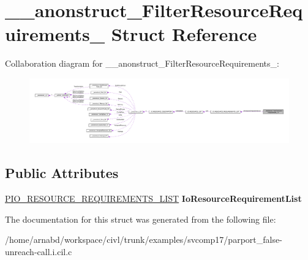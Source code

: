 \hypertarget{struct____anonstruct__FilterResourceRequirements__73}{}\section{\+\_\+\+\_\+anonstruct\+\_\+\+Filter\+Resource\+Requirements\+\_ Struct Reference}
\label{struct____anonstruct__FilterResourceRequirements__73}


Collaboration diagram for \+\_\+\+\_\+anonstruct\+\_\+\+Filter\+Resource\+Requirements\+\_\+:
\nopagebreak
\begin{figure}[H]
\begin{center}
\leavevmode
\includegraphics[width=350pt]{struct____anonstruct__FilterResourceRequirements__73__coll__graph}
\end{center}
\end{figure}
\subsection*{Public Attributes}
\begin{DoxyCompactItemize}
\item 
\hypertarget{struct____anonstruct__FilterResourceRequirements__73_aed5f7263b5374af576169a6a6a9c3cc6}{}\hyperlink{struct__IO__RESOURCE__REQUIREMENTS__LIST}{P\+I\+O\+\_\+\+R\+E\+S\+O\+U\+R\+C\+E\+\_\+\+R\+E\+Q\+U\+I\+R\+E\+M\+E\+N\+T\+S\+\_\+\+L\+I\+S\+T} {\bfseries Io\+Resource\+Requirement\+List}\label{struct____anonstruct__FilterResourceRequirements__73_aed5f7263b5374af576169a6a6a9c3cc6}

\end{DoxyCompactItemize}


The documentation for this struct was generated from the following file\+:\begin{DoxyCompactItemize}
\item 
/home/arnabd/workspace/civl/trunk/examples/svcomp17/parport\+\_\+false-\/unreach-\/call.\+i.\+cil.\+c\end{DoxyCompactItemize}
